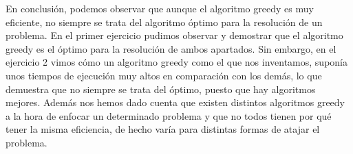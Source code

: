 En conclusión, podemos observar que aunque el algoritmo greedy es muy eficiente, no siempre se trata del algoritmo óptimo para la resolución de un problema. 
En el primer ejercicio pudimos observar y demostrar que el algoritmo greedy es el óptimo para la resolución de ambos apartados. Sin embargo, en el ejercicio 2
vimos cómo un algoritmo greedy como el que nos inventamos, suponía unos tiempos de ejecución muy altos en comparación con los demás, lo que demuestra que no siempre
se trata del óptimo, puesto que hay algoritmos mejores.
Además nos hemos dado cuenta que existen distintos algoritmos greedy a la hora de enfocar un determinado problema y que no todos tienen por qué tener la misma eficiencia,
de hecho varía para distintas formas de atajar el problema. 